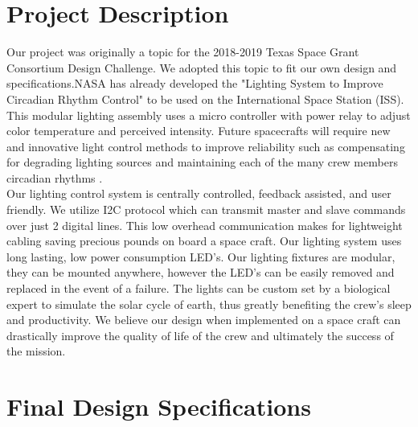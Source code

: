 \documentclass[12pt,a4paper]{report}
\begin{document}
\section{Project Description}
Our project was originally a topic for the 2018-2019 Texas Space Grant Consortium Design Challenge. We adopted this topic to fit our own design and specifications.NASA has already developed the "Lighting System to Improve Circadian Rhythm Control" to be used on the International Space Station (ISS). \cite{nasapatent} This modular lighting assembly uses a micro controller with power relay to adjust color temperature and perceived intensity. Future spacecrafts will require new and innovative light control methods to improve reliability such as compensating for degrading lighting sources and maintaining each of the many crew members circadian rhythms \cite{tsgc}. \\ \linebreak
Our lighting control system is centrally controlled, feedback assisted, and user friendly. We utilize I2C protocol which can transmit master and slave commands over just 2 digital lines. This low overhead communication makes for lightweight cabling saving precious pounds on board a space craft. Our lighting system uses long lasting, low power consumption LED's. Our lighting fixtures are modular, they can be mounted anywhere, however the LED's can be easily removed and replaced in the event of a failure. The lights can be custom set by a biological expert to simulate the solar cycle of earth, thus greatly benefiting the crew's sleep and productivity. We believe our design when implemented on a space craft can drastically improve the quality of life of the crew and ultimately the success of the mission.



\section{Final Design Specifications}
\end{document}
